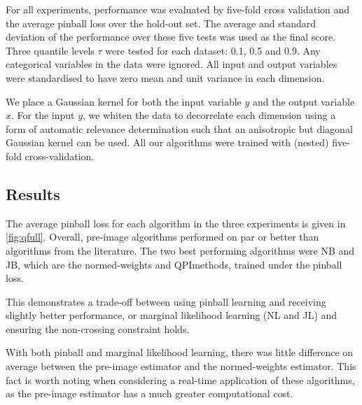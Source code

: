 \documentclass[twoside]{article} \usepackage{aistats2017}
\theoremstyle{definition}
\theoremstyle{theorem}
\newcommand{\qpi}{QPI}
\begin{document}
	For all experiments, performance was evaluated by five-fold cross validation and the average pinball loss over the hold-out set. The average and standard deviation of the performance over these five tests was used as the final score. Three quantile levels $\tau$ were tested for each dataset: 0.1, 0.5 and 0.9. Any categorical variables in the data were ignored. All input and output variables were standardised to have zero mean and unit variance in each dimension.
	
	We place a Gaussian kernel for both the input variable $y$ and the output variable $x$. For the input $y$, we whiten the data to decorrelate each dimension using a form of automatic relevance determination \citep{rasmussen2006gaussian} such that an anisotropic but diagonal Gaussian kernel can be used. All our algorithms were trained with (nested) five-fold cross-validation.
%
%
	\subsection{Results}
	\label{sec:experiments:results}
		
%
		
		The average pinball loss for each algorithm in the three experiments is given in \cref{fig:qfull}. Overall, pre-image algorithms performed on par or better than algorithms from the literature. The two best performing algorithms were NB and JB, which are the normed-weights and \qpi\space methods, trained under the pinball loss. %

		This demonstrates a trade-off between using pinball learning and receiving slightly better performance, or marginal likelihood learning (NL and JL) and ensuring the non-crossing constraint holds. %

		With both pinball and marginal likelihood learning, there was little difference on average between the pre-image estimator and the normed-weights estimator. This fact is worth noting when considering a real-time application of these algorithms, as the pre-image estimator has a much greater computational cost.
		
\end{document}
